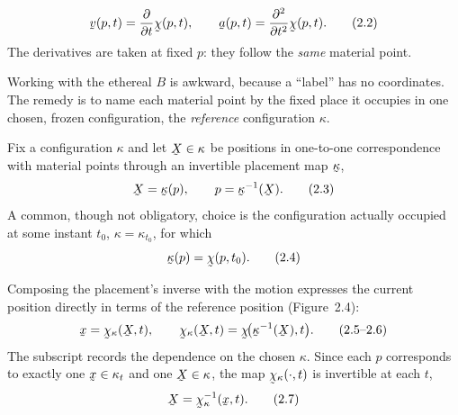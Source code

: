 \begin{definition}\label{def:va}
\begin{equation}
   \bv(p,t)=\frac{\partial}{\partial t}\bchi(p,t),\qquad
   \ba(p,t)=\frac{\partial^{2}}{\partial t^{2}}\bchi(p,t). \tag{2.2}\label{eq:2.2}
\end{equation}
The derivatives are taken at fixed $p$: they follow the \emph{same} material
point.
\end{definition}

Working with the ethereal $B$ is awkward, because a ``label'' has no
coordinates. The remedy is to name each material point by the fixed place
it occupies in one chosen, frozen configuration, the \emph{reference}
configuration $\kappa$.

\begin{definition}\label{def:ref}
Fix a configuration $\kappa$ and let $\bX\in\kappa$ be positions in one-to-one
correspondence with material points through an invertible placement map
$\bkappa$,
\begin{equation}
   \bX=\bkappa(p),\qquad p=\bkappa^{-1}(\bX). \tag{2.3}\label{eq:2.3}
\end{equation}
A common, though not obligatory, choice is the configuration actually
occupied at some instant $t_0$, $\kappa=\kappa_{t_0}$, for which
\begin{equation}
   \bkappa(p)=\bchi(p,t_0). \tag{2.4}\label{eq:2.4}
\end{equation}
\end{definition}

Composing the placement's inverse with the motion expresses the current
position directly in terms of the reference position (Figure~2.4):
\begin{equation}
   \bx=\bchi_\kappa(\bX,t),\qquad
   \bchi_\kappa(\bX,t)=\bchi\!\big(\bkappa^{-1}(\bX),t\big). \tag{2.5--2.6}\label{eq:2.5}
\end{equation}
The subscript records the dependence on the chosen $\kappa$. Since each
$p$ corresponds to exactly one $\bx\in\kappa_t$ and one $\bX\in\kappa$, the
map $\bchi_\kappa(\cdot,t)$ is invertible at each $t$,
\begin{equation}
   \bX=\bchi_\kappa^{-1}(\bx,t). \tag{2.7}\label{eq:2.7}
\end{equation}

